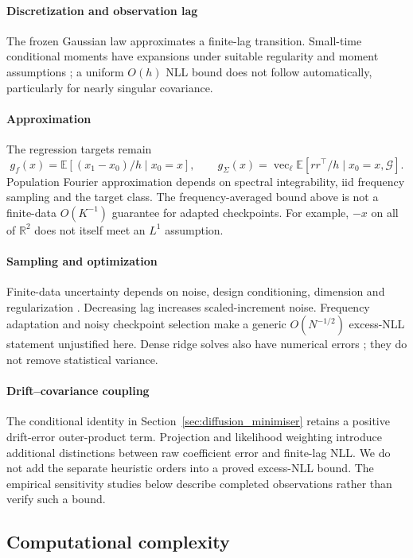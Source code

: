 \documentclass{article}
\newcommand{\E}{\mathbb{E}}
\def\E{\mathbb{E}}
\begin{document}
\paragraph{Discretization and observation lag}
The frozen Gaussian law approximates a finite-lag transition. Small-time conditional moments have expansions under suitable regularity and moment assumptions \citep{BerntSDE,kloeden1992numerical}; a uniform $O(h)$ NLL bound does not follow automatically, particularly for nearly singular covariance.
\paragraph{Approximation}
The regression targets remain
\[
g_f(x)=\E[(x_1-x_0)/h\mid x_0=x],\qquad
g_\Sigma(x)=\operatorname{vec}_\ell\E[rr^\top/h\mid x_0=x,\mathcal G].
\]
Population Fourier approximation depends on spectral integrability, iid frequency sampling and the target class. The frequency-averaged bound above is not a finite-data $O(K^{-1})$ guarantee for adapted checkpoints. For example, $-x$ on all of $\mathbb R^2$ does not itself meet an $L^1$ assumption.
\paragraph{Sampling and optimization}
Finite-data uncertainty depends on noise, design conditioning, dimension and regularization \citep{gyorfi2002distribution,wainwright2019high}. Decreasing lag increases scaled-increment noise. Frequency adaptation and noisy checkpoint selection make a generic $O(N^{-1/2})$ excess-NLL statement unjustified here. Dense ridge solves also have numerical errors \citep{golub2013matrix,trefethen1997numerical}; they do not remove statistical variance.
\paragraph{Drift--covariance coupling}
The conditional identity in Section~\ref{sec:diffusion_minimiser} retains a positive drift-error outer-product term. Projection and likelihood weighting introduce additional distinctions between raw coefficient error and finite-lag NLL. We do not add the separate heuristic orders into a proved excess-NLL bound. The empirical sensitivity studies below describe completed observations rather than verify such a bound.

\subsection{Computational complexity}
\end{document}
